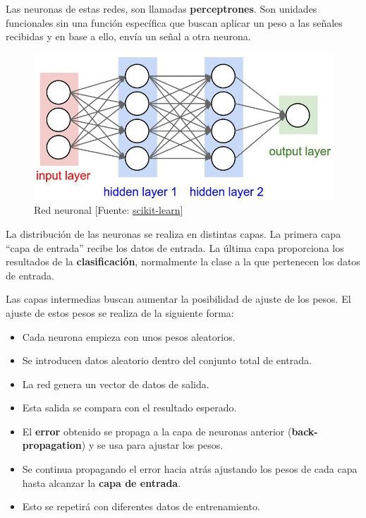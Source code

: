 	Las neuronas de estas redes, son llamadas \textbf{perceptrones}. Son unidades funcionales sin una función específica que buscan aplicar un peso a las señales recibidas y en base a ello, envía un señal a otra neurona.

	\begin{figure}[htb]
		\begin{center}
			\includegraphics[width=4.5in]{figures/neural_network.jpg}
			\caption{Red neuronal [Fuente: \href{www.scikit-learn.org}{scikit-learn}]}
		\end{center}
		\label{network}
	\end{figure}

	La distribución de las neuronas se realiza en distintas capas. La primera capa ``capa de entrada'' recibe los datos de entrada. La última capa proporciona los resultados de la \textbf{clasificación}, normalmente la clase a la que pertenecen los datos de entrada.

	Las capas intermedias buscan aumentar la posibilidad de ajuste de los pesos. El ajuste de estos pesos se realiza de la siguiente forma:

	\begin{itemize}
		\item Cada neurona empieza con unos pesos aleatorios.
		\item Se introducen datos aleatorio dentro del conjunto total de entrada.
		\item La red genera un vector de datos de salida.
		\item Esta salida se compara con el resultado esperado.
		\item El \textbf{error} obtenido se propaga a la capa de neuronas anterior (\textbf{back-propagation}) y se usa para ajustar los pesos.
		\item Se continua propagando el error hacia atrás ajustando los pesos de cada capa hasta alcanzar la \textbf{capa de entrada}.
		\item Esto se repetirá con diferentes datos de entrenamiento.
 	\end{itemize}

